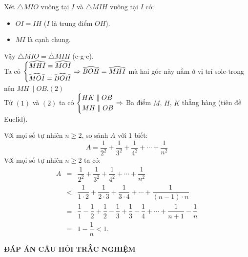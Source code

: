 \begin{ex}
{\begin{enumerate}
				Xét $\triangle MIO$ vuông tại $I$ và $\triangle MIH$ vuông tại $I$ có:
				\begin{itemize}
					\item $OI=IH$ ($I$ là trung điểm $OH$).
					\item $MI$ là cạnh chung.
				\end{itemize}
				Vậy $\triangle MIO=\triangle MIH$ (c-g-c).\\
				Ta có $\left\{\begin{aligned}&\widehat{MHI}=\widehat{MOI}\\&\widehat{MOI}=\widehat{BOH}\end{aligned}\right.\Rightarrow\widehat{BOH}=\widehat{MHI}$ mà hai góc này nằm ở vị trí sole-trong nên $MH\parallel OB$.\hfill$(2)$\\
				Từ $(1)$ và $(2)$ ta có $\left\{\begin{aligned}&HK\parallel OB\\&MH\parallel OB\end{aligned}\right.\Rightarrow$ Ba điểm $M$, $H$, $K$ thẳng hàng (tiên đề Euclid).
			\end{enumerate}
			
				
			}
		\end{ex}
	
		\begin{ex}%
			Với mọi số tự nhiên $n\geq 2$, so sánh $A$ với $1$ biết:
			$$A=\dfrac{1}{2^2}+\dfrac{1}{3^2}+\dfrac{1}{4^2}+\cdots+\dfrac{1}{n^2}$$
			\loigiai
			{
				Với mọi số tự nhiên $n\geq 2$ ta có:
				\begin{eqnarray*}
					A&=&\dfrac{1}{2^2}+\dfrac{1}{3^2}+\dfrac{1}{4^2}+\cdots+\dfrac{1}{n^2}\\
					&<&\dfrac{1}{1\cdot2}+\dfrac{1}{2\cdot3}+\dfrac{1}{3\cdot4}+\cdots+\dfrac{1}{(n-1)\cdot n}\\
					&=&\dfrac{1}{1}-\dfrac{1}{2}+\dfrac{1}{2}-\dfrac{1}{3}+\dfrac{1}{3}-\dfrac{1}{4}+\cdots+\dfrac{1}{n+1}-\dfrac{1}{n}\\
					&=&1-\dfrac{1}{n}<1.
				\end{eqnarray*}
			}
		\end{ex}
	
	
	
	



	\begin{center}
		\textbf{ĐÁP ÁN CÂU HỎI TRẮC NGHIỆM}
	\end{center}
	\boxans
	
